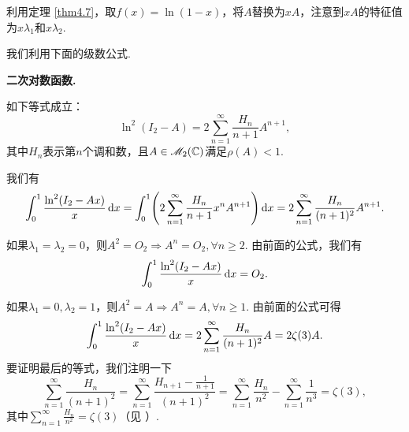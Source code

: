 \begin{solution}
  利用定理 \ref{thm4.7}，取$f(x)=\ln(1-x)$，将$A$替换为$xA$，注意到$xA$的特征值为$x\lambda_1$和$x\lambda_2$.
\end{solution}

\begin{solution}
  我们利用下面的级数公式.
  \begin{mybox}
    {\bfseries 二次对数函数.}

    如下等式成立：
    \[
      \ln^2(I_2 - A) = 2 \sum_{n=1}^\infty \frac{H_n}{n+1} A^{n+1},
    \]
    其中$H_n$表示第$n$个调和数，且$A\in\mathscr M_2(\mathbb C)$满足$\rho(A)<1$.
  \end{mybox}

  我们有
  \[
    \int_0^1\frac{\ln^2(I_2-Ax)}x \dif x = \int_0^1 \left( 2\sum_{n=1}^\infty \frac{H_n}{n+1}x^nA^{n+1} \right)\dif x = 2\sum_{n=1}^\infty \frac{H_n}{(n+1)^2} A^{n+1}.
  \]

  \begin{inparaenum}[(a)]
    \item 如果$\lambda_1=\lambda_2=0$，则$A^2=O_2\Rightarrow
        A^n=O_2,\forall n\ge2$. 由前面的公式，我们有
        \[
          \int_0^1\frac{\ln^2(I_2-Ax)}x \mathop{}\!\mathrm d x = O_2.
        \]

    \item 如果$\lambda_1=0,\lambda_2=1$，则$A^2=A\Rightarrow
        A^n=A,\forall n\ge1$. 由前面的公式可得
        \[
          \int_0^1\frac{\ln^2(I_2-Ax)}x \mathop{}\!\mathrm d x = 2\sum_{n=1}^\infty \frac{H_n}{(n+1)^2}A = 2\zeta(3)A.
        \]
        要证明最后的等式，我们注明一下
        \[
          \sum_{n=1}^\infty \frac{H_n}{(n+1)^2} = \sum_{n=1}^\infty \frac{H_{n+1}-\frac1{n+1}}{(n+1)^2} =
          \sum_{n=1}^\infty \frac{H_n}{n^2} - \sum_{n=1}^\infty \frac1{n^3} = \zeta(3),
        \]
        其中$\sum_{n=1}^\infty \frac{H_n}{n^2}=\zeta(3)$（见
        \cite[Problem3.55, p.148]{22}）.
  \end{inparaenum}
\end{solution}

